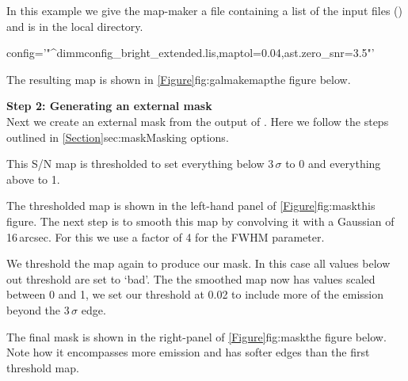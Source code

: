 \documentclass[11pt,oneside,chapters]{starlink}
\begin{document}
In this example we give the map-maker a file containing a list of the
input files () and
 is in the local directory.

\begin{terminalv}
config='"^dimmconfig_bright_extended.lis,maptol=0.04,ast.zero_snr=3.5"'
\end{terminalv}
The resulting map is shown in \cref{Figure}{fig:galmakemap}{the figure below}.


\textbf{Step 2: Generating an external mask}
\vspace{0.2cm}\\
Next we create an external mask from the output of \makemap. Here we
follow the steps outlined in \cref{Section}{sec:mask}{Masking options}.

\begin{terminalv}
\end{terminalv}

This S/N map is thresholded to set everything below 3\,$\sigma$ to 0 and
everything above to 1.

\begin{terminalv}
\end{terminalv}
The thresholded map is shown in the left-hand panel of
\cref{Figure}{fig:mask}{this figure}. The next step is to smooth this map
by convolving it with a Gaussian of 16\,arcsec. For this we use a factor
of 4 for the FWHM parameter.

\begin{terminalv}
\end{terminalv}

We threshold the map again to produce our mask. In this case all
values below out threshold are set to `bad'. The the smoothed map now
has values scaled between 0 and 1, we set our threshold at 0.02 to
include more of the emission beyond the 3\,$\sigma$ edge.
\begin{terminalv}
\end{terminalv}
The final mask is shown in the right-panel of \cref{Figure}{fig:mask}{the figure below}.
Note how it encompasses more emission and has softer edges than the
first threshold map. \\
\end{document}
